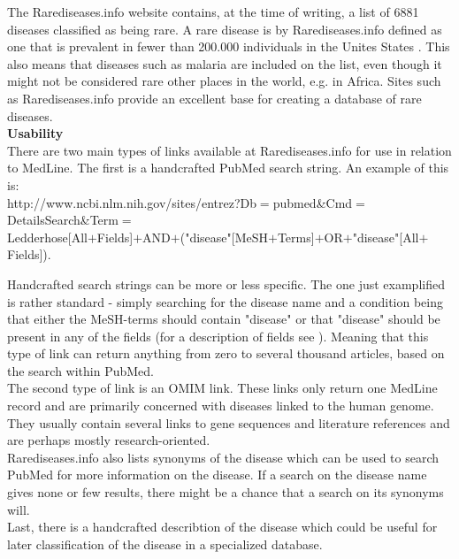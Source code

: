The Rarediseases.info website contains, at the time of writing, a list
of 6881 diseases classified as being rare. A rare disease is by
Rarediseases.info defined as one that is prevalent in fewer than
200.000 individuals in the Unites States \cite{RareDiseaseDef}. This
also means that diseases such as malaria are included on the list,
even though it might not be considered rare other places in the world,
e.g. in Africa. Sites such as Rarediseases.info provide an excellent
base for creating a database of rare diseases.\\

\textbf{Usability} \\
There are two main types of links available at Rarediseases.info for
use in relation to MedLine. The first is a handcrafted PubMed search
string. An example of this is:\\

{\small
http://www.ncbi.nlm.nih.gov/sites/entrez?Db$=$pubmed\&Cmd$=$DetailsSearch\&Term$=$ \\
Ledderhose[All$+$Fields]$+$AND$+$("disease"[MeSH$+$Terms]$+$OR$+$"disease"[All$+$Fields]). \\
}

Handcrafted search strings can be more or less specific. The one just
examplified is rather standard - simply searching for the disease name
and a condition being that either the MeSH-terms should contain
"disease" or that "disease" should be present in any of the fields
(for a description of fields see
\cite{PubMedHelpSearchFieldDescriptionsTags}). Meaning that this
type of link can return anything from zero to several thousand
articles, based on the search within PubMed.\\

The second type of link is an OMIM link. These links only return one
MedLine record and are primarily concerned with diseases linked to the
human genome. They usually contain several links to gene sequences and
literature references and are perhaps mostly research-oriented.\\

Rarediseases.info also lists synonyms of the disease which can be used
to search PubMed for more information on the disease. If a search on
the disease name gives none or few results, there might be a chance
that a search on its synonyms will.\\

Last, there is a handcrafted describtion of the disease which could be
useful for later classification of the disease in a specialized
database.\\

